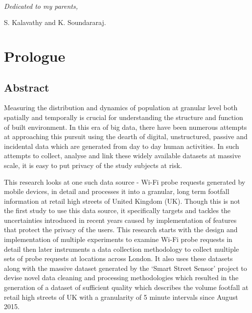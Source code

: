 
\cleardoublepage
~\vfill
\begin{doublespace}
\noindent\fontsize{12}{12}\selectfont\itshape \nohyphenation
\hspace{4cm}Dedicated to my parents,

\hspace{3.5cm}S. Kalavathy and K. Soundararaj.
\end{doublespace}
\vfill
\vfill

\chapter*{Prologue}

\section*{Abstract} 

Measuring the distribution and dynamics of population at granular level both spatially and temporally is crucial for understanding the structure and function of built environment.
In this era of big data, there have been numerous attempts at approaching this pursuit using the dearth of digital, unstructured, passive and incidental data which are generated from day to day human activities.
In such attempts to collect, analyse and link these widely available datasets at massive scale, it is easy to put privacy of the study subjects at risk.

This research looks at one such data source - Wi-Fi probe requests generated by mobile devices, in detail and processes it into a granular, long term footfall information at retail high streets of United Kingdom (UK).
Though this is not the first study to use this data source, it specifically targets and tackles the uncertainties introduced in recent years caused by implementation of features that protect the privacy of the users.
This research starts with the design and implementation of multiple experiments to examine Wi-Fi probe requests in detail then later instruments a data collection methodology to collect multiple sets of probe requests at locations across London.
It also uses these datasets along with the massive dataset generated by the `Smart Street Sensor' project to devise novel data cleaning and processing methodologies which resulted in the generation of a dataset of sufficient quality which  describes the volume footfall at retail high streets of UK with a granularity of 5 minute intervals since August 2015.

